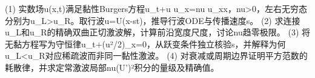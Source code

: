 (1) 实数场u(x,t)满足黏性Burgers方程u_t+u u_x=nu u_xx，nu>0，左右无穷态分别为u_L>u_R。取行波u=U(x-st)，推导行波ODE与传播速度s。
(2) 求连接u_L和u_R的精确双曲正切激波解，计算前沿宽度尺度，讨论nu趋零极限。
(3) 将无黏方程写为守恒律u_t+(u²/2)_x=0，从跃变条件独立核验s，并解释为何u_L<u_R对应稀疏波而非同一黏性激波。
(4) 对衰减或周期边界证明平方范数的耗散律，并求定常激波局部nu(U')²积分的量级及精确值。
